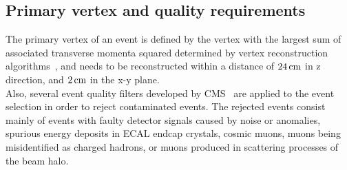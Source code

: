 
\subsection{Primary vertex and quality requirements}
The primary vertex of an event is defined by the vertex with the largest sum of associated transverse momenta squared determined by vertex reconstruction algorithms~\cite{vertex}, and needs to be reconstructed within a distance of $24\,\text{cm}$ in z direction, and $2\,\text{cm}$ in the x-y plane.\\
Also, several event quality filters developed by CMS~\cite{MetFilter} are applied to the event selection in order to reject contaminated events.
The rejected events consist mainly of events with faulty detector signals caused by noise or anomalies, spurious energy deposits in ECAL endcap crystals, cosmic muons, muons being misidentified as charged hadrons, or muons produced in scattering processes of the beam halo.


